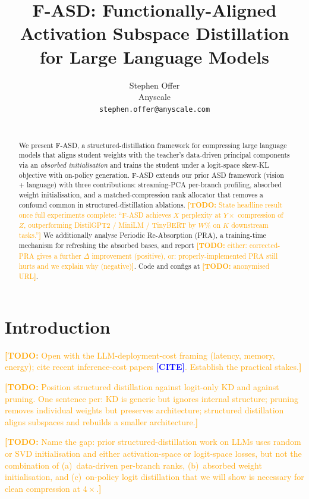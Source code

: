 \documentclass{article}
\title{F-ASD: Functionally-Aligned Activation Subspace Distillation\\for Large Language Models}
\author{%
  Stephen Offer \\
  Anyscale \\
  \texttt{stephen.offer@anyscale.com}
  \\\\\todo{add co-authors}
}
\newcommand{\todo}[1]{\textcolor{orange}{\textbf{[TODO:} #1\textbf{]}}}
\newcommand{\todocite}{\textcolor{blue}{\textbf{[CITE]}}}
\newcommand{\fasd}{\texorpdfstring{\textsc{F-ASD}}{F-ASD}}
\newcommand{\asd}{\texorpdfstring{\textsc{ASD}}{ASD}}
\newcommand{\pra}{\texorpdfstring{\textsc{PRA}}{PRA}}
\begin{document}
\maketitle

\begin{abstract}
We present \fasd{}, a structured-distillation framework for compressing
large language models that aligns student weights with the teacher's
data-driven principal components via an \emph{absorbed initialisation} and
trains the student under a logit-space skew-KL objective with on-policy
generation. \fasd{} extends our prior \asd{} framework (vision +
language) with three contributions: streaming-PCA per-branch profiling,
absorbed weight initialisation, and a matched-compression rank allocator that
removes a confound common in structured-distillation ablations.
\todo{State headline result once full experiments complete: ``\fasd{}
achieves $X$ perplexity at $Y\times$ compression of $Z$, outperforming
DistilGPT2 / MiniLM / TinyBERT by $W\%$ on $K$ downstream tasks.''}
We additionally analyse Periodic Re-Absorption (\pra{}), a
training-time mechanism for refreshing the absorbed bases, and report
\todo{either: corrected-PRA gives a further $\Delta$ improvement (positive),
or: properly-implemented PRA still hurts and we explain why (negative)}.
Code and configs at \todo{anonymised URL}.
\end{abstract}

\section{Introduction}
\todo{Open with the LLM-deployment-cost framing (latency, memory, energy);
cite recent inference-cost papers \todocite. Establish the practical stakes.}

\todo{Position structured distillation against logit-only KD and against
pruning. One sentence per: KD is generic but ignores internal structure;
pruning removes individual weights but preserves architecture; structured
distillation aligns subspaces and rebuilds a smaller architecture.}

\todo{Name the gap: prior structured-distillation work on LLMs uses random
or SVD initialisation and either activation-space or logit-space losses, but
not the combination of (a)~data-driven per-branch ranks, (b)~absorbed
weight initialisation, and (c)~on-policy logit distillation that we will
show is necessary for clean compression at $4\times$.}
\end{document}
